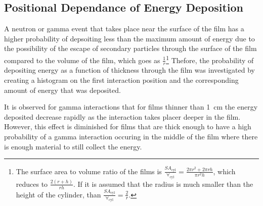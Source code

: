\subsection{Positional Dependance of Energy Deposition}
A neutron or gamma event that takes place near the surface of the film has a higher probability of depsoiting less than the maximum amount of energy due to the possibility of the escape of secondary particles through the surface of the film compared to the volume of the film, which goes as $\frac{1}{r}$\footnote{%
The surface area to volume ratio of the films is $\frac{SA_\text{cyl}}{\forall_\text{cyl}} = \frac{2\pi r^2+2\pi rh}{\pi r^2 h}$, which reduces to $\frac{2(r +h)}{rh}$. 
If it is assumed that the radius is much smaller than the height of the cylinder, than $\frac{SA_\text{cyl}}{\forall_\text{cyl}} = \frac{2}{r}$.
}
Thefore, the probability of depositing energy as a function of thickness through the film was investigated by creating a histogram on the first interaction position and the corresponding amount of energy that was deposited.

It is observed for gamma interactions that for films thinner than \SI{1}{\cm} the energy deposited decrease rapidly as the interaction takes placer deeper in the film.
However, this effect is diminished for films that are thick enough to have a high probability of a gamma interaction occuring in the middle of the film where there is enough material to still collect the energy.
